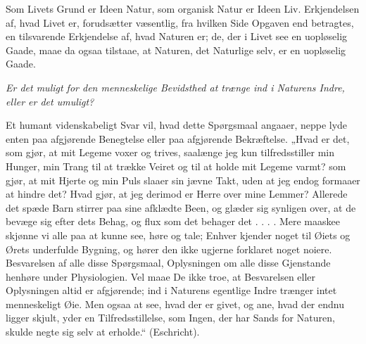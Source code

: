 \documentclass[11pt]{book}
\newcommand{\opage}[1]{\marginnote{\footnotesize\textit{[#1]}}}
\begin{document}
Som Livets Grund er Ideen Natur, som organisk Natur er Ideen Liv.
Erkjendelsen af, hvad Livet er, forudsætter væsentlig, fra hvilken Side
Opgaven end betragtes, en tilsvarende Erkjendelse af, hvad Naturen er;
de, der i Livet see en uopløselig Gaade, maae da ogsaa tilstaae, at
Naturen, det Naturlige selv, er en uopløselig Gaade.

\emph{Er det muligt for den menneskelige Bevidsthed at trænge ind i
Naturens Indre, eller er det umuligt?}

Et humant videnskabeligt Svar vil, hvad dette Spørgsmaal angaaer, neppe
lyde enten paa afgjørende Benegtelse eller paa afgjørende Bekræftelse.
„Hvad er det, som gjør, at mit Legeme voxer og trives, saalænge jeg kun
tilfredsstiller min Hunger, min Trang til at trække Veiret og til at
holde mit Legeme varmt? som gjør, at mit Hjerte og min Puls slaaer sin
jævne Takt, uden at jeg endog formaaer at hindre det? Hvad gjør, at jeg
derimod er Herre over mine Lemmer? Allerede det spæde Barn stirrer paa
sine afklædte Been, og
\opage{287} \setcounter{footnote}{0}%
glæder sig synligen over, at de bevæge sig efter dets Behag, og flux som
det behager det . . . . Mere maaskee skjønne vi alle paa at kunne see,
høre og tale; Enhver kjender noget til Øiets og Ørets underfulde
Bygning, og hører den ikke ugjerne forklaret noget noiere. Besvarelsen
af alle disse Spørgsmaal, Oplysningen om alle disse Gjenstande henhøre
under Physiologien. Vel maae De ikke troe, at Besvarelsen eller
Oplysningen altid er afgjørende; ind i Naturens egentlige Indre trænger
intet menneskeligt Øie. Men ogsaa at see, hvad der er givet, og ane,
hvad der endnu ligger skjult, yder en Tilfredsstillelse, som Ingen, der
har Sands for Naturen, skulde negte sig selv at erholde.“ (Eschricht).
\end{document}
